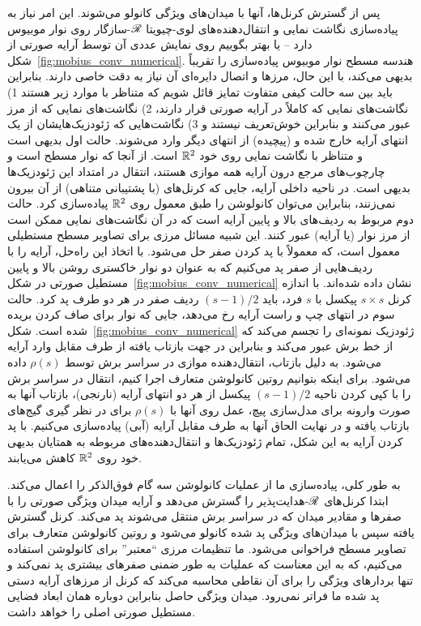 پس از گسترش کرنل‌ها، آنها با میدان‌های ویژگی کانولو می‌شوند.
این امر نیاز به پیاده‌سازی نگاشت نمایی و انتقال‌دهنده‌های لوی-چیویتا $\mathscr{R}$-سازگار روی نوار موبیوس دارد -- یا بهتر بگوییم روی نمایش عددی آن توسط آرایه صورتی از شکل~\ref{fig:mobius_conv_numerical}.
هندسه مسطح نوار موبیوس پیاده‌سازی را تقریباً بدیهی می‌کند، با این حال، مرزها و اتصال دایره‌ای آن نیاز به دقت خاصی دارند.
بنابراین باید بین سه حالت کیفی متفاوت تمایز قائل شویم که متناظر با موارد زیر هستند
1) نگاشت‌های نمایی که کاملاً در آرایه صورتی قرار دارند،
2) نگاشت‌های نمایی که از مرز عبور می‌کنند و بنابراین خوش‌تعریف نیستند و
3) نگاشت‌هایی که ژئودزیک‌هایشان از یک انتهای آرایه خارج شده و (پیچیده) از انتهای دیگر وارد می‌شوند.
حالت اول بدیهی است و متناظر با نگاشت نمایی روی خود $\mathbb{R}^2$ است.
از آنجا که نوار مسطح است و چارچوب‌های مرجع درون آرایه همه موازی هستند، انتقال در امتداد این ژئودزیک‌ها بدیهی است.
در ناحیه داخلی آرایه، جایی که کرنل‌های (با پشتیبانی متناهی) از آن بیرون نمی‌زنند، بنابراین می‌توان کانولوشن را طبق معمول روی $\mathbb{R}^2$ پیاده‌سازی کرد.
حالت دوم مربوط به ردیف‌های بالا و پایین آرایه است که در آن نگاشت‌های نمایی ممکن است از مرز نوار (یا آرایه) عبور کنند.
این شبیه مسائل مرزی برای تصاویر مسطح مستطیلی معمول است، که معمولاً با پد کردن صفر حل می‌شود.
با اتخاذ این راه‌حل، آرایه را با ردیف‌هایی از صفر پد می‌کنیم که به عنوان دو نوار خاکستری روشن بالا و پایین مستطیل صورتی در شکل~\ref{fig:mobius_conv_numerical} نشان داده شده‌اند.
با اندازه کرنل $s\times s$ پیکسل با $s$ فرد، باید $(s-1)/2$ ردیف صفر در هر دو طرف پد کرد.
حالت سوم در انتهای چپ و راست آرایه رخ می‌دهد، جایی که نوار برای صاف کردن بریده شده است.
شکل~\ref{fig:mobius_conv_numerical} ژئودزیک نمونه‌ای را تجسم می‌کند که از خط برش عبور می‌کند و بنابراین در جهت بازتاب یافته از طرف مقابل وارد آرایه می‌شود.
به دلیل بازتاب، انتقال‌دهنده موازی در سراسر برش توسط $\rho(s)$ داده می‌شود.
برای اینکه بتوانیم روتین کانولوشن متعارف اجرا کنیم، انتقال در سراسر برش را با کپی کردن ناحیه $(s-1)/2$ پیکسل از هر دو انتهای آرایه (نارنجی)، بازتاب آنها به صورت وارونه برای مدل‌سازی پیچ، عمل روی آنها با $\rho(s)$ برای در نظر گیری گیج‌های بازتاب یافته و در نهایت الحاق آنها به طرف مقابل آرایه (آبی) پیاده‌سازی می‌کنیم.
با پد کردن آرایه به این شکل، تمام ژئودزیک‌ها و انتقال‌دهنده‌های مربوطه به همتایان بدیهی خود روی $\mathbb{R}^2$ کاهش می‌یابند.

به طور کلی، پیاده‌سازی ما از عملیات کانولوشن سه گام فوق‌الذکر را اعمال می‌کند.
ابتدا کرنل‌های $\mathscr{R}$-هدایت‌پذیر را گسترش می‌دهد و آرایه میدان ویژگی صورتی را با صفرها و مقادیر میدان که در سراسر برش منتقل می‌شوند پد می‌کند.
کرنل گسترش یافته سپس با میدان‌های ویژگی پد شده کانولو می‌شود و روتین کانولوشن متعارف برای تصاویر مسطح فراخوانی می‌شود.
ما تنظیمات مرزی ``معتبر'' برای کانولوشن استفاده می‌کنیم، که به این معناست که عملیات به طور ضمنی صفرهای بیشتری پد نمی‌کند و تنها بردارهای ویژگی را برای آن نقاطی محاسبه می‌کند که کرنل از مرزهای آرایه دستی پد شده ما فراتر نمی‌رود.
میدان ویژگی حاصل بنابراین دوباره همان ابعاد فضایی مستطیل صورتی اصلی را خواهد داشت.




